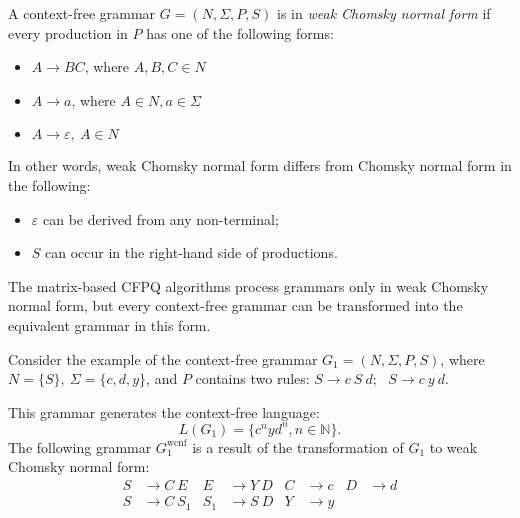 
\begin{definition} A context-free grammar $G = (N, \Sigma, P, S)$ is in \emph{weak Chomsky normal form} if every production in $P$ has one of the following forms:
    \begin{itemize}
        \item $A \rightarrow BC$, where $A, B, C \in N$
        \item  $A \rightarrow a$, where $A \in N, a \in \Sigma$
        \item $A \rightarrow \varepsilon,~A \in N$
    \end{itemize}
\end{definition}

In other words, weak Chomsky normal form differs from Chomsky normal form in the following:
\begin{itemize}
    \item $\varepsilon$ can be derived from any non-terminal;
    \item $S$ can occur in the right-hand side of productions.
\end{itemize}

The matrix-based CFPQ algorithms process grammars only in weak Chomsky normal form, but every context-free grammar can be transformed into the equivalent grammar in this form.

Consider the example of the context-free grammar $G_1=(N, \Sigma, P, S)$, where~$N=\{S\},~\Sigma=\{c, d, y\}$, and $P$ contains two rules:
$S \rightarrow c \ S \ d; \ \ \ 
S \rightarrow c \ y \ d
$.%

This grammar generates the context-free language: $$L(G_1) = \{c^nyd^n, n \in \mathbb{N}\}.$$
The following grammar $G_1^{\text{wcnf}}$ is a result of the transformation of $G_1$ to weak Chomsky normal form:
\begin{align*}
S& \to C \ E   & E& \to Y \ D   & C& \to c &D& \to d   \\
S& \to C \ S_1 & S_1& \to S \ D & Y& \to y &&  \\
\end{align*}


